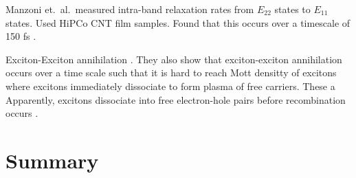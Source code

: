 Manzoni et.\ al.\ measured intra-band relaxation rates from $E_{22}$ states to $E_{11}$ states. Used HiPCo CNT film samples.  Found that this occurs over a timescale of 150 fs \cite{manzoni2005intersubband}.

Exciton-Exciton annihilation \cite{valkunas2006exciton, yuma2013biexciton}.
They also show that exciton-exciton annihilation occurs over a time scale such that it is hard to reach Mott densitty of excitons where excitons immediately dissociate to form plasma of free carriers. These a
Apparently, excitons dissociate into free electron-hole pairs before recombination occurs \cite{kumamoto2014spontaneous}.




\section{Summary}
